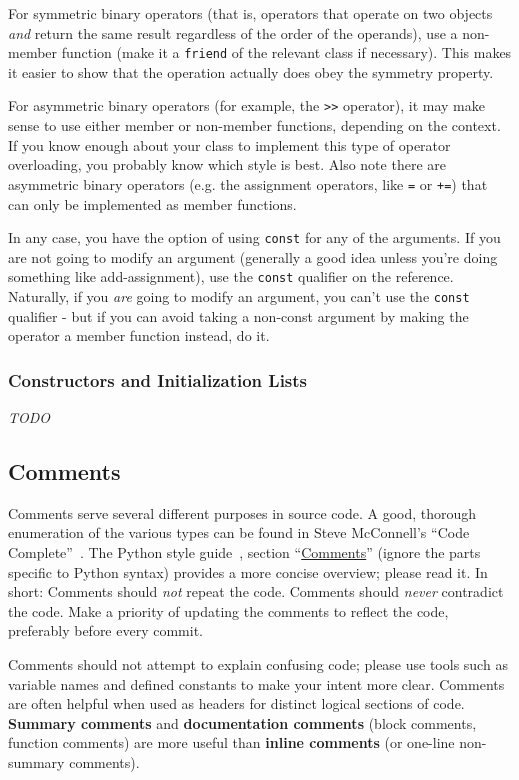 \documentclass[12pt]{article}
\newcommand{\textdef}[1]{\textbf{#1}}
\begin{document}
For symmetric binary operators (that is, operators that operate on two objects \emph{and} return the same result regardless of the order of the operands), use a non-member function (make it a \texttt{friend} of the relevant class if necessary). This makes it easier to show that the operation actually does obey the symmetry property.

For asymmetric binary operators (for example, the \texttt{>{}>} operator), it may make sense to use either member or non-member functions, depending on the context. If you know enough about your class to implement this type of operator overloading, you probably know which style is best. Also note there are asymmetric binary operators (e.g. the assignment operators, like \texttt{=} or \texttt{+=}) that can only be implemented as member functions.

In any case, you have the option of using \texttt{const} for any of the arguments. If you are not going to modify an argument (generally a good idea unless you're doing something like add-assignment), use the \texttt{const} qualifier on the reference. Naturally, if you \emph{are} going to modify an argument, you can't use the \texttt{const} qualifier - but if you can avoid taking a non-const argument by making the operator a member function instead, do it.

\subsubsection{Constructors and Initialization Lists}
\textit{TODO}

\subsection{Comments}
Comments serve several different purposes in source code. A good, thorough enumeration of the various types can be found in Steve McConnell's ``Code Complete''~\cite{codecomplete}. The Python style guide~\cite{pyguide}, section ``\href{http://www.python.org/dev/peps/pep-0008/#comments}{Comments}'' (ignore the parts specific to Python syntax) provides a more concise overview; please read it. In short: Comments should \emph{not} repeat the code. Comments should \emph{never} contradict the code. Make a priority of updating the comments to reflect the code, preferably before every commit.

Comments should not attempt to explain confusing code; please use tools such as variable names and defined constants to make your intent more clear. Comments are often helpful when used as headers for distinct logical sections of code. \textdef{Summary comments} and \textdef{documentation comments} (block comments, function comments) are more useful than \textdef{inline comments} (or one-line non-summary comments).
\end{document}
